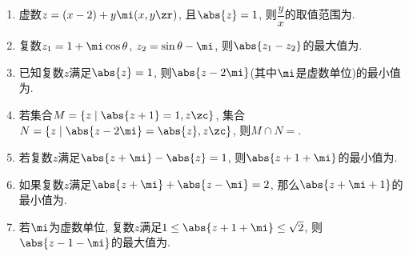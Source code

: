 \begin{enumerate}
    \item 虚数$z=(x-2)+y\mi(x,y\zr)$, 且$\abs{z}=1$, 则$\dfrac{y}{x}$的取值范围为. 
    
    
    \item 复数$z_1 =1+\mi\cos\theta$, $z_2=\sin\theta-\mi$, 则$\abs{z_1-z_2}$的最大值为. 
    
    \item 已知复数$z$满足$\abs{z}=1$, 则$\abs{z-2\mi}$(其中$\mi$是虚数单位)的最小值为. 


    \item 若集合$M=\{z\mid\abs{z+1}=1, z\zc\}$, 集合$N=\{z\mid\abs{z-2\mi}=\abs{z}, z\zc\}$, 则$M\cap N=$. 
    
    \item 若复数$z$满足$\abs{z+\mi}-\abs{z}=1$, 则$\abs{z+1+\mi}$的最小值为. 
    
    \item 如果复数$z$满足$\abs{z+\mi}+\abs{z-\mi}=2$, 那么$\abs{z+\mi+1}$的最小值为.

    \item 若$\mi$为虚数单位, 复数$z$满足$1\leq\abs{z+1+\mi}\leq\sqrt{2}$, 则$\abs{z-1-\mi}$的最大值为. 


\end{enumerate}

